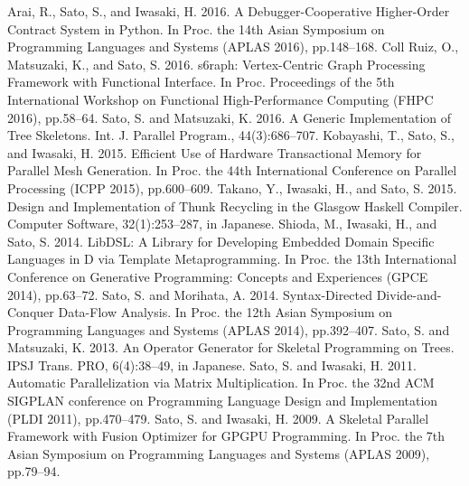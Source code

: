 \documentclass[a4paper,dvipdfmx]{article}
\newcounter{pubcount}
\begin{document}
\begin{thebibliography}{100}
  Arai, R., Sato, S., and Iwasaki, H. 2016. A Debugger-Cooperative Higher-Order Contract System in Python. In Proc. the 14th Asian Symposium on Programming Languages and Systems (APLAS 2016), pp.148–168.
  Coll Ruiz, O., Matsuzaki, K., and Sato, S. 2016. s6raph: Vertex-Centric Graph Processing Framework with Functional Interface. In Proc. Proceedings of the 5th International Workshop on Functional High-Performance Computing (FHPC 2016), pp.58–64.
  Sato, S. and Matsuzaki, K. 2016. A Generic Implementation of Tree Skeletons. Int. J. Parallel Program., 44(3):686–707.
  Kobayashi, T., Sato, S., and Iwasaki, H. 2015. Efficient Use of Hardware Transactional Memory for Parallel Mesh Generation. In Proc. the 44th International Conference on Parallel Processing (ICPP 2015), pp.600–609.
  Takano, Y., Iwasaki, H., and Sato, S. 2015. Design and Implementation of Thunk Recycling in the Glasgow Haskell Compiler. Computer Software, 32(1):253–287, in Japanese.
  Shioda, M., Iwasaki, H., and Sato, S. 2014. LibDSL: A Library for Developing Embedded Domain Specific Languages in D via Template Metaprogramming. In Proc. the 13th International Conference on Generative Programming: Concepts and Experiences (GPCE 2014), pp.63–72.
  Sato, S. and Morihata, A. 2014. Syntax-Directed Divide-and-Conquer Data-Flow Analysis. In Proc. the 12th Asian Symposium on Programming Languages and Systems (APLAS 2014), pp.392–407.
  Sato, S. and Matsuzaki, K. 2013. An Operator Generator for Skeletal Programming on Trees. IPSJ Trans. PRO, 6(4):38–49, in Japanese.
  Sato, S. and Iwasaki, H. 2011. Automatic Parallelization via Matrix Multiplication. In Proc. the 32nd ACM SIGPLAN conference on Programming Language Design and Implementation (PLDI 2011), pp.470–479.
  Sato, S. and Iwasaki, H. 2009. A Skeletal Parallel Framework with Fusion Optimizer for GPGPU Programming. In Proc. the 7th Asian Symposium on Programming Languages and Systems (APLAS 2009), pp.79–94.
 \setcounter{pubcount}{\theenumiv}
\end{thebibliography}
\end{document}
